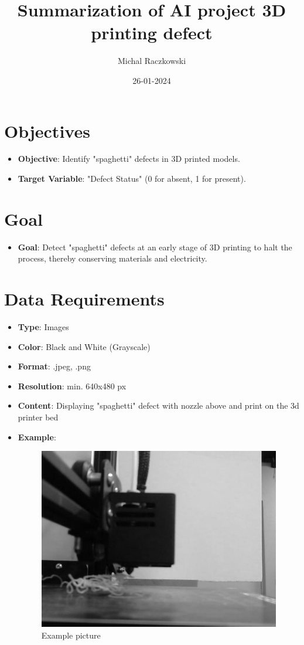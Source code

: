 \documentclass[12pt,a4paper]{article}
\title{{\textbf{Summarization of AI project 3D printing defect}}}
\author{Michal Raczkowski}
\date{26-01-2024}
\begin{document}
\maketitle
\thispagestyle{empty} %

\newpage
\tableofcontents
\newpage

\setcounter{page}{1} %




\section{Objectives}
\begin{itemize}
    \item \textbf{Objective}: Identify "spaghetti" defects in 3D printed models.
    \item \textbf{Target Variable}: "Defect Status" (0 for absent, 1 for present).
\end{itemize}

\section{Goal}
\begin{itemize}
    \item \textbf{Goal}: Detect "spaghetti" defects at an early stage of 3D printing to halt the process, thereby conserving materials and electricity.
\end{itemize}

\section{Data Requirements}
\begin{itemize}
    \item \textbf{Type}: Images 
    \item \textbf{Color}: Black and White (Grayscale)
    \item \textbf{Format}: .jpeg, .png
    \item \textbf{Resolution}: min. 640x480 px
    \item \textbf{Content}: Displaying "spaghetti" defect with nozzle above and print on the 3d printer bed
    \item \textbf{Example}:
    \begin{figure}[h]
        \centering
        \includegraphics[width=0.5\linewidth]{no_support_57.jpg}
        \caption{Example picture \cite{onlineOpenSource1}}
        \label{fig:spaghetti3D}
    \end{figure}
        
\end{itemize}
\end{document}
